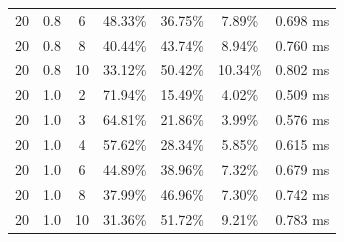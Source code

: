 \documentclass[11pt,a4paper]{article}
\begin{document}
\begin{longtable}{ccccccc}
        20 & 0.8 & 6 & 48.33\% & 36.75\% & 7.89\% & 0.698 ms \\
        20 & 0.8 & 8 & 40.44\% & 43.74\% & 8.94\% & 0.760 ms \\
        20 & 0.8 & 10 & 33.12\% & 50.42\% & 10.34\% & 0.802 ms \\
        \midrule
        20 & 1.0 & 2 & 71.94\% & 15.49\% & 4.02\% & 0.509 ms \\
        20 & 1.0 & 3 & 64.81\% & 21.86\% & 3.99\% & 0.576 ms \\
        20 & 1.0 & 4 & 57.62\% & 28.34\% & 5.85\% & 0.615 ms \\
        20 & 1.0 & 6 & 44.89\% & 38.96\% & 7.32\% & 0.679 ms \\
        20 & 1.0 & 8 & 37.99\% & 46.96\% & 7.30\% & 0.742 ms \\
        20 & 1.0 & 10 & 31.36\% & 51.72\% & 9.21\% & 0.783 ms \\

\end{longtable}
\end{document}
